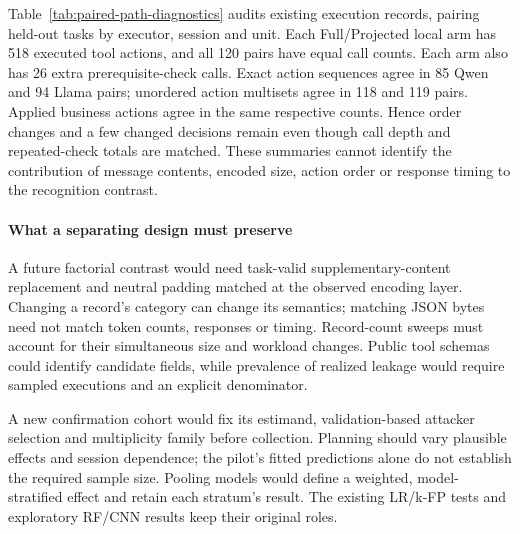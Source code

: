 Table~\ref{tab:paired-path-diagnostics} audits existing execution records, pairing held-out tasks by executor, session and unit. Each Full/Projected local arm has 518 executed tool actions, and all 120 pairs have equal call counts. Each arm also has 26 extra prerequisite-check calls. Exact action sequences agree in 85 Qwen and 94 Llama pairs; unordered action multisets agree in 118 and 119 pairs. Applied business actions agree in the same respective counts. Hence order changes and a few changed decisions remain even though call depth and repeated-check totals are matched. These summaries cannot identify the contribution of message contents, encoded size, action order or response timing to the recognition contrast.

\paragraph{What a separating design must preserve}
A future factorial contrast would need task-valid supplementary-content replacement and neutral padding matched at the observed encoding layer. Changing a record's category can change its semantics; matching JSON bytes need not match token counts, responses or timing. Record-count sweeps must account for their simultaneous size and workload changes. Public tool schemas could identify candidate fields, while prevalence of realized leakage would require sampled executions and an explicit denominator.

A new confirmation cohort would fix its estimand, validation-based attacker selection and multiplicity family before collection. Planning should vary plausible effects and session dependence; the pilot's fitted predictions alone do not establish the required sample size. Pooling models would define a weighted, model-stratified effect and retain each stratum's result. The existing LR/k-FP tests and exploratory RF/CNN results keep their original roles.









\FloatBarrier


